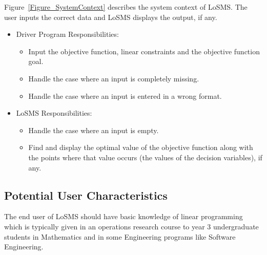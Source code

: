 \documentclass[12pt]{article}
\newcommand{\famname}{LoSMS} %
\begin{document}

Figure~\ref{Figure_SystemContext} describes the system context of \famname{}. 
The user inputs the correct data and \famname{} displays the output, if any.

\begin{itemize}
	\item Driver Program Responsibilities: 
	\begin{itemize}
		\item Input the objective function, linear constraints and the 
		objective function goal.
		\item Handle the case where an input is completely missing.
		\item Handle the case where an input is entered in a wrong format.
	\end{itemize}
	\item \famname{} Responsibilities:
	\begin{itemize}
		\item Handle the case where an input is empty.
		\item Find and display the optimal value of the objective function 
		along with the points where that value occurs (the values of the 
		decision variables), if any.
	\end{itemize}
\end{itemize}


\subsection{Potential User Characteristics} \label{SecUserCharacteristics}

The end user of \famname{} should have basic knowledge of linear programming  
which is typically given in an operations research course to year 3 
undergraduate students in Mathematics and in some Engineering programs like 
Software Engineering.  
\end{document}
